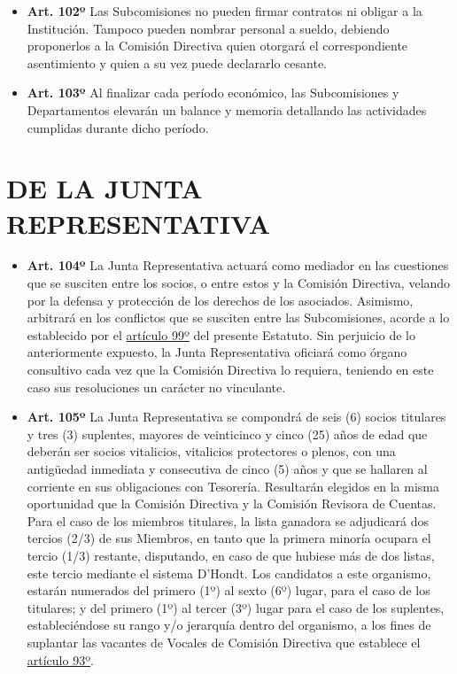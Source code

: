 \documentclass[openany]{book}
\providecommand{\tightlist}{%
  \setlength{\itemsep}{0pt}\setlength{\parskip}{0pt}}
\begin{document}
\begin{itemize}
\tightlist
\item
  \textbf{Art. 102º}
  Las Subcomisiones no pueden firmar contratos ni obligar a la Institución. Tampoco pueden nombrar personal a sueldo, debiendo proponerlos a la Comisión Directiva quien otorgará el correspondiente asentimiento y quien a su vez puede declararlo cesante.
\end{itemize}

\begin{itemize}
\tightlist
\item
  \textbf{Art. 103º}
  Al finalizar cada período económico, las Subcomisiones y Departamentos elevarán un balance y memoria detallando las actividades cumplidas durante dicho período.
\end{itemize}

\hypertarget{cap21}{%
\chapter{DE LA JUNTA REPRESENTATIVA}\label{cap21}}

\begin{itemize}
\tightlist
\item
  \textbf{Art. 104º}
  La Junta Representativa actuará como mediador en las cuestiones que se susciten entre los socios, o entre estos y la Comisión Directiva, velando por la defensa y protección de los derechos de los asociados. Asimismo, arbitrará en los conflictos que se susciten entre las Subcomisiones, acorde a lo establecido por el \protect\hyperlink{art99}{artículo 99º} del presente Estatuto. Sin perjuicio de lo anteriormente expuesto, la Junta Representativa oficiará como órgano consultivo cada vez que la Comisión Directiva lo requiera, teniendo en este caso sus resoluciones un carácter no vinculante.
\end{itemize}

\begin{itemize}
\tightlist
\item
  \textbf{Art. 105º}
  La Junta Representativa se compondrá de seis (6) socios titulares y tres (3) suplentes, mayores de veinticinco y cinco (25) años de edad que deberán ser socios vitalicios, vitalicios protectores o plenos, con una antigüedad inmediata y consecutiva de cinco (5) años y que se hallaren al corriente en sus obligaciones con Tesorería. Resultarán elegidos en la misma oportunidad que la Comisión Directiva y la Comisión Revisora de Cuentas. Para el caso de los miembros titulares, la lista ganadora se adjudicará dos tercios (2/3) de sus Miembros, en tanto que la primera minoría ocupara el tercio (1/3) restante, disputando, en caso de que hubiese más de dos listas, este tercio mediante el sistema D'Hondt. Los candidatos a este organismo, estarán numerados del primero (1º) al sexto (6º) lugar, para el caso de los titulares; y del primero (1º) al tercer (3º) lugar para el caso de los suplentes, estableciéndose su rango y/o jerarquía dentro del organismo, a los fines de suplantar las vacantes de Vocales de Comisión Directiva que establece el \protect\hyperlink{art93}{artículo 93º}.
\end{itemize}
\end{document}
